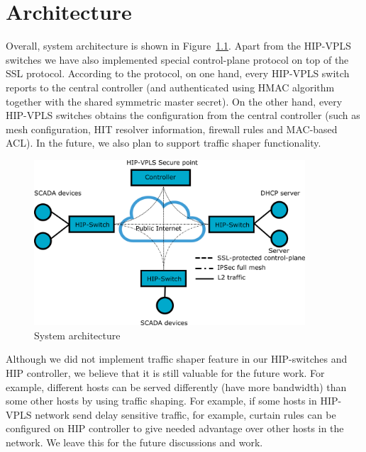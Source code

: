 \chapter{Architecture}

Overall, system architecture is shown in Figure~\ref{fig:architecture}. Apart from the HIP-VPLS switches
we have also implemented special control-plane protocol on top of the SSL protocol. According to the 
protocol, on one hand, every HIP-VPLS switch reports to the central controller (and authenticated using HMAC algorithm
together with the shared symmetric master secret). On the other hand, every HIP-VPLS switches obtains the configuration
from the central controller (such as mesh configuration, HIT resolver information, firewall rules and MAC-based ACL).
In the future, we also plan to support traffic shaper functionality.


\begin{figure}[h!]
\centering
\includegraphics[width=0.9\textwidth]{graphics/arch.png}
\caption{System architecture}
\label{fig:architecture}
\end{figure} 

Although we did not implement traffic shaper feature in our HIP-switches and HIP 
controller, we believe that it is still valuable for the future work.
For example, different hosts can be served differently (have more bandwidth)
than some other hosts by using traffic shaping. For example, if some hosts in HIP-VPLS 
network send delay sensitive traffic, for example, curtain rules can be configured 
on HIP controller to give needed advantage over other hosts in the network. We leave 
this for the future discussions and work.
    
